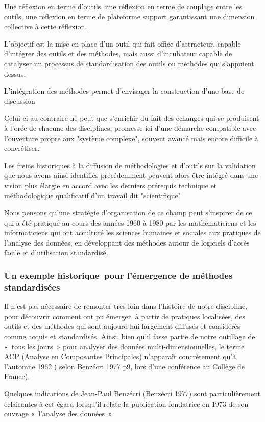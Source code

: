 Une réflexion en terme d'outils, une réflexion en terme de couplage entre les outils, une réflexion en terme de plateforme support garantissant une dimension collective à cette réflexion.

L'objectif est la mise en place d'un outil qui fait office d'attracteur,  capable d'intégrer des outils et des méthodes, mais aussi d'incubateur capable de catalyser un processus de standardisation des outils ou méthodes qui s'appuient dessus. 

L'intégration des méthodes permet d'envisager la construction d'une base de discussion

 Celui ci au contraire ne peut que s'enrichir du fait des échanges qui se produisent à l'orée de chacune des disciplines, promesse ici d'une démarche compatible avec l'ouverture propre aux "système complexe", souvent avancé mais encore difficile à concrétiser.
 
 Les freins historiques à la diffusion de méthodologies et d'outils sur la validation que nous avons ainsi identifiés précédemment peuvent alors être intégré dans une vision plus élargie en accord avec les derniers prérequis technique et méthodologique qualificatif d'un travail dit "scientifique"  

Nous pensons qu’une stratégie d’organisation de ce champ peut s’inspirer  de ce qui a été pratiqué au cours des années 1960 à 1980 par les mathématiciens et les informaticiens qui ont acculturé les sciences humaines et sociales aux pratiques de l'analyse des données, en développant des méthodes autour de logiciels d'accès facile et d'utilisation standardisé.

\subsubsection{Un exemple historique pour l’émergence de méthodes standardisées}

Il n’est pas nécessaire de remonter très loin dans l’histoire de notre discipline, pour découvrir comment ont pu émerger, à partir  de pratiques localisées, des outils et des méthodes qui sont aujourd'hui largement diffusés et considérés comme acquis et standardisés. Ainsi, bien qu’il fasse partie de notre outillage de « tous les jours » pour analyser des données multi-dimensionnelles, le terme ACP (Analyse en Composantes Principales) n'apparaît concrètement qu'à l'automne 1962 ( selon Benzécri 1977  p9, lors d'une conférence au Collège de France). 

Quelques indications de Jean-Paul Benzécri (Benzécri 1977) sont particulièrement éclairantes à cet égard lorsqu'il relate la publication fondatrice en 1973 de son ouvrage « l'analyse des données » 


